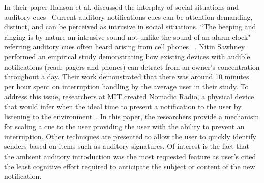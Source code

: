 In their paper Hanson et al. discussed the interplay of social
situations and auditory cues~\cite{hansson2001subtle} Current auditory
notifications cues can be attention demanding, distinct, and can be perceived as
intrusive in social situations. ``The beeping and ringing is by nature an
intrusive sound not unlike the sound of an alarm clock" referring auditory cues
often heard arising from cell phones  ~\cite{hansson2001subtle}.  Nitin Sawhney
performed an empirical study demonstrating how existing devices with audible
notifications (read: pagers and phones) can detract from an owner's
concentration throughout a day.  Their work demonstrated that there was around
10 minutes per hour spent on  interruption handling by the average user in their study.
To address this issue, researchers at MIT created Nomadic Radio, a physical
device that would infer when the ideal time to present a notification to the
user by listening to the environment~\cite{sawhney1999nomadic}. In this paper,
the researchers provide a mechanism for scaling a cue to the user providing
the user with the ability to prevent an interruption. Other techniques are
presented to allow the user to quickly identify senders based on items such as
auditory signatures.  Of interest is the fact that the ambient auditory
introduction was the most requested feature as user's cited the least cognitive
effort required to anticipate the subject or content of the new notification.
